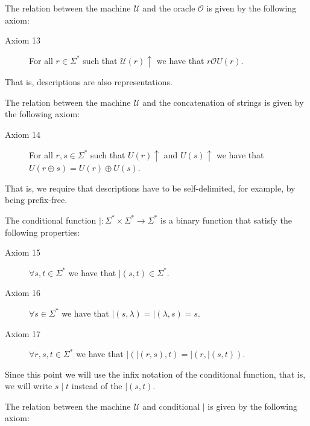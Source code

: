 \vskip 0.25cm

The relation between the machine $\mathcal{U}$ and the oracle $\mathcal{O}$ is given by the following axiom:

\vskip 0.25cm

\begin{description}
\item[Axiom 13] For all $r \in \Sigma^\ast$ such that $\mathcal{U}(r) \uparrow$ we have that $r \mathcal{O} U(r)$.
\end{description}

\vskip 0.25cm

That is, descriptions are also representations.

\vskip 0.25cm

The relation between the machine $\mathcal{U}$ and the concatenation of strings is given by the following axiom:

\vskip 0.25cm

\begin{description}
\item[Axiom 14] For all $r, s \in \Sigma^\ast$ such that $U(r) \uparrow$ and $U(s) \uparrow$ we have that $U(r \oplus s) = U(r) \oplus U(s)$.
\end{description}

\vskip 0.25cm

That is, we require that descriptions have to be self-delimited, for example, by being prefix-free.

The conditional function $\mid : \Sigma^\ast \times \Sigma^\ast \rightarrow \Sigma^\ast$ is a binary function that satisfy the following properties:

\vskip 0.25cm

\begin{description}
\item[Axiom 15] $\forall s, t \in \Sigma^\ast$ we have that $\mid(s, t) \in \Sigma^\ast$.
\item[Axiom 16] $\forall s \in \Sigma^\ast$ we have that $\mid (s, \lambda) = \mid( \lambda, s) = s$.
\item[Axiom 17] $\forall r, s, t \in \Sigma^\ast$ we have that $\mid (\mid (r, s), t) = \mid (r, \mid (s, t))$.
\end{description}

Since this point we will use the infix notation of the conditional function, that is, we will write $s \mid t$ instead of the $\mid (s, t)$.

The relation between the machine $\mathcal{U}$ and conditional $\mid$ is given by the following axiom:

